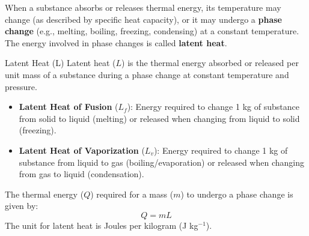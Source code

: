When a substance absorbs or releases thermal energy, its temperature may change (as described by specific heat capacity), or it may undergo a \textbf{phase change} (e.g., melting, boiling, freezing, condensing) at a constant temperature. The energy involved in phase changes is called \textbf{latent heat}.

\begin{keyconcept}{Latent Heat (L)}
Latent heat (\(L\)) is the thermal energy absorbed or released per unit mass of a substance during a phase change at constant temperature and pressure.
\begin{itemize}
    \item \textbf{Latent Heat of Fusion} (\(L_f\)): Energy required to change 1 kg of substance from solid to liquid (melting) or released when changing from liquid to solid (freezing).
    \item \textbf{Latent Heat of Vaporization} (\(L_v\)): Energy required to change 1 kg of substance from liquid to gas (boiling/evaporation) or released when changing from gas to liquid (condensation).
\end{itemize}
The thermal energy (\(Q\)) required for a mass (\(m\)) to undergo a phase change is given by:
\begin{equation}
Q = mL
\label{eq:latent_heat}
\end{equation}
The unit for latent heat is Joules per kilogram (J kg\(^{-1}\)).
\end{keyconcept}



